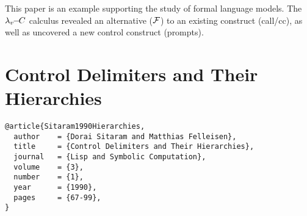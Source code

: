 \documentclass[letterpaper]{llncs}
\begin{document}
This paper is an example supporting the study of formal language models. The $ \lambda_v\!\!-\!\!C $ calculus revealed an alternative ($ \mathcal{F} $) to an existing construct (call/cc), as well as uncovered a new control construct (prompts).






\section*{Control Delimiters and Their Hierarchies}%

\begin{verbatim}
@article{Sitaram1990Hierarchies,
  author    = {Dorai Sitaram and Matthias Felleisen},
  title     = {Control Delimiters and Their Hierarchies},
  journal   = {Lisp and Symbolic Computation},
  volume    = {3},
  number    = {1},
  year      = {1990},
  pages     = {67-99},
}
\end{verbatim}

\end{document}
